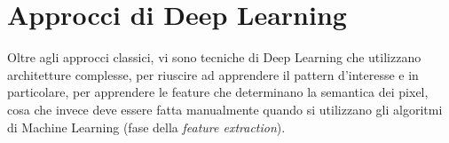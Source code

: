 








\section{Approcci di Deep Learning}
Oltre agli approcci classici, vi sono tecniche di Deep Learning che utilizzano architetture complesse, per riuscire ad apprendere il pattern d'interesse e in particolare, per apprendere le feature che determinano la semantica dei pixel, cosa che invece deve essere fatta manualmente quando si utilizzano gli algoritmi di Machine Learning (fase della \textit{feature extraction}).\\


